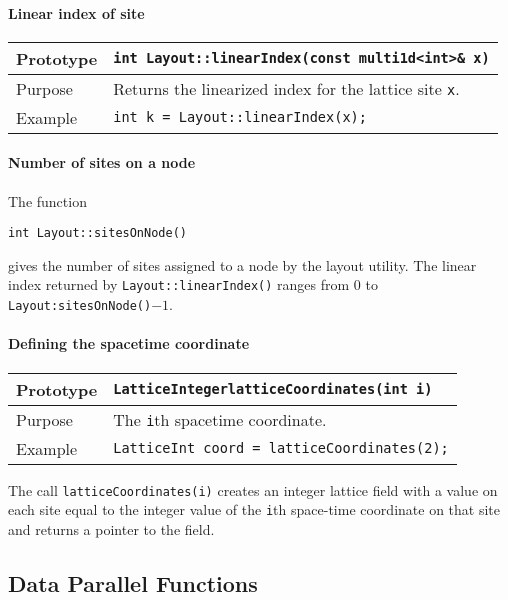 \documentclass[12pt,letterpaper]{article}
\newcommand{\tLatticeInt}{LatticeInteger}
\begin{document}
\paragraph{Linear index of site}

\begin{flushleft}
  \begin{tabular}{|l|l|}
  \hline
  Prototype      & \verb|int Layout::linearIndex(const multi1d<int>& x)|\\
    \hline
  Purpose        & Returns the linearized index for the lattice site \verb|x|. \\
\hline
  Example  & \verb|int k = Layout::linearIndex(x);| \\
   \hline
 \end{tabular}
\end{flushleft}

\paragraph{Number of sites on a node}

The function
\begin{flushleft}
  \verb|int Layout::sitesOnNode()|
\end{flushleft}
gives the number of sites assigned to a node by the layout utility.
The linear index returned by \verb|Layout::linearIndex()| ranges from 0 to
\verb|Layout:sitesOnNode()|$ - 1$.

\paragraph{Defining the spacetime coordinate}

\begin{flushleft}
  \begin{tabular}{|l|l|}
  \hline
  Prototype      & {\tt \tLatticeInt}\verb|latticeCoordinates(int i)|\\
    \hline
  Purpose        & The {\tt i}th spacetime coordinate. \\
\hline
  Example  & \verb|LatticeInt coord = latticeCoordinates(2);| \\
   \hline
 \end{tabular}
\end{flushleft}
%
The call \verb|latticeCoordinates(i)| creates an integer lattice field with a
value on each site equal to the integer value of the \verb|i|th
space-time coordinate on that site and returns a pointer to the field.

\subsection{Data Parallel Functions}
\end{document}

